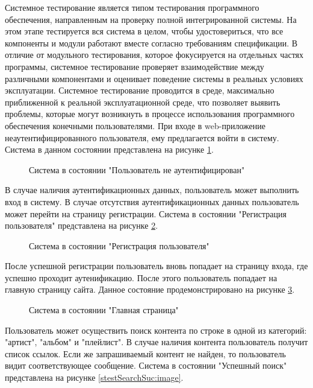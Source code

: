 Системное тестирование является типом тестирования программного обеспечения, направленным на проверку полной интегрированной системы. На этом этапе тестируется вся система в целом, чтобы удостовериться, что все компоненты и модули работают вместе согласно требованиям спецификации. В отличие от модульного тестирования, которое фокусируется на отдельных частях программы, системное тестирование проверяет взаимодействие между различными компонентами и оценивает поведение системы в реальных условиях эксплуатации.
Системное тестирование проводится в среде, максимально приближенной к реальной эксплуатационной среде, что позволяет выявить проблемы, которые могут возникнуть в процессе использования программного обеспечения конечными пользователями.
При входе в web-приложение неаутентифицированного пользователя, ему предлагается войти в систему. Система в данном состоянии представлена на рисунке \ref{stestLoginEmpty:image}.
\begin{figure}[!htb]
\caption{Система в состоянии "Пользователь не аутентифицирован"}
\label{stestLoginEmpty:image}
\end{figure}
В случае наличия аутентификационных данных, пользователь может выполнить вход в систему. В случае отсутствия аутентификационных данных пользователь может перейти на страницу регистрации. Система в состоянии "Регистрация пользователя" представлена на рисунке \ref{stestReg:image}.

\begin{figure}[!htb]
	\caption{Система в состоянии "Регистрация пользователя"}
	\label{stestReg:image}
\end{figure}

После успешной регистрации пользователь вновь попадает на страницу входа, где успешно проходит аутенификацию. После этого пользователь попадает на главную страницу сайта. Данное состояние продемонстрировано на рисунке \ref{stestHome:image}.

\begin{figure}[!htb]
	\caption{Система в состоянии "Главная страница"}
	\label{stestHome:image}
\end{figure}

Пользователь может осуществить поиск контента по строке в одной из категорий: "артист", "альбом" и "плейлист". В случае наличия контента пользователь получит список ссылок. Если же запрашиваемый контент не найден, то пользователь видит соответствующее сообщение. Система в состоянии "Успешный поиск" представлена на рисунке \ref{stestSearchSuc:image}.

